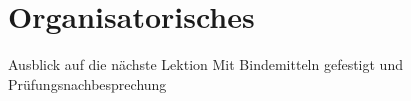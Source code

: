 \section{Organisatorisches}
\BlueSectionSlide





\begin{frame}{Ausblick auf die nächste Lektion}
Mit Bindemitteln gefestigt und Prüfungsnachbesprechung

\end{frame}


